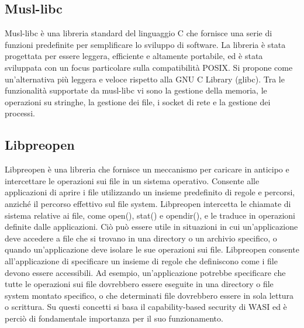 \subsection{Musl-libc}
Musl-libc è una libreria standard del linguaggio C che fornisce una serie di funzioni predefinite per semplificare lo
sviluppo di software. La libreria è stata progettata per essere leggera, efficiente e altamente portabile, ed è stata
sviluppata con un focus particolare sulla compatibilità POSIX. Si propone come un'alternativa più leggera e veloce
rispetto alla GNU C Library (glibc). Tra le funzionalità supportate da musl-libc vi sono la gestione della memoria, le
operazioni su stringhe, la gestione dei file, i socket di rete e la gestione dei processi.
\subsection{Libpreopen}
\label{sec:libpreopen}
Libpreopen è una libreria che fornisce un meccanismo per caricare in anticipo e intercettare le operazioni sui file in
un sistema operativo. Consente alle applicazioni di aprire i file utilizzando un insieme predefinito di regole e
percorsi, anziché il percorso effettivo sul file system. Libpreopen intercetta le chiamate di sistema relative ai file,
come open(), stat() e opendir(), e le traduce in operazioni definite dalle applicazioni. Ciò può essere utile in
situazioni in cui un'applicazione deve accedere a file che si trovano in una directory o un archivio specifico, o quando
un'applicazione deve isolare le sue operazioni sui file. Libpreopen consente all'applicazione di specificare un insieme
di regole che definiscono come i file devono essere accessibili. Ad esempio, un'applicazione potrebbe specificare che
tutte le operazioni sui file dovrebbero essere eseguite in una directory o file system montato specifico, o che
determinati file dovrebbero essere in sola lettura o scrittura. Su questi concetti si basa il capability-based security
di WASI ed è perciò di fondamentale importanza per il suo funzionamento.
